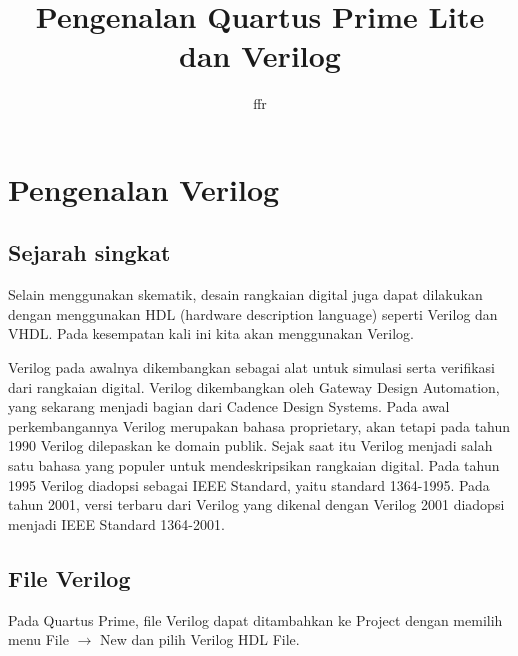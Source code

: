 \documentclass[a4paper,11pt,bahasa]{extarticle}
\begin{document}
\title{Pengenalan Quartus Prime Lite dan Verilog}
\author{ffr}
\date{}
\maketitle

\tableofcontents





\section{Pengenalan Verilog}

\subsection{Sejarah singkat}

Selain menggunakan skematik, desain rangkaian digital juga dapat dilakukan
dengan menggunakan HDL (hardware description language)
seperti Verilog dan VHDL.
Pada kesempatan kali ini kita akan menggunakan Verilog.

Verilog pada awalnya dikembangkan sebagai alat untuk simulasi serta
verifikasi dari rangkaian digital.
Verilog dikembangkan oleh Gateway Design Automation, yang
sekarang menjadi bagian dari Cadence Design Systems.
Pada awal perkembangannya Verilog merupakan bahasa
proprietary, akan tetapi pada
tahun 1990 Verilog dilepaskan ke
domain publik. Sejak saat itu Verilog menjadi salah satu
bahasa yang populer untuk mendeskripsikan rangkaian digital.
Pada tahun 1995 Verilog diadopsi sebagai IEEE Standard, yaitu standard
1364-1995. Pada tahun 2001, versi terbaru dari Verilog yang dikenal dengan
Verilog 2001 diadopsi menjadi IEEE Standard 1364-2001.

\subsection{File Verilog}

Pada Quartus Prime, file Verilog dapat ditambahkan ke Project
dengan memilih menu {\sf File $\rightarrow$ New} dan pilih
{\sf Verilog HDL File}.
\end{document}
